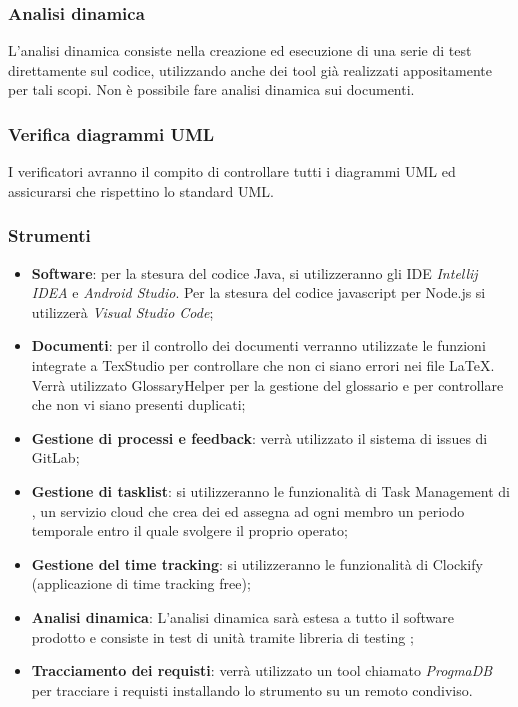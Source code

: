 \subsubsection{Analisi dinamica}
L’analisi dinamica consiste nella creazione ed esecuzione di una serie di test direttamente sul codice, utilizzando anche dei tool già realizzati appositamente per tali scopi. Non è possibile fare analisi dinamica sui documenti.
\subsubsection{Verifica diagrammi UML}
I verificatori avranno il compito di controllare tutti i diagrammi UML ed assicurarsi che rispettino lo standard UML.



\subsubsection{Strumenti}
\begin{itemize}
    \item \textbf{Software}:  per la stesura del codice Java, si utilizzeranno gli IDE \emph{Intellij IDEA} e \emph{Android Studio}. Per la stesura del codice javascript per Node.js si utilizzerà \emph{Visual Studio Code};
    \item \textbf{Documenti}: per il controllo dei documenti verranno utilizzate le funzioni integrate a TexStudio per controllare che non ci siano errori nei file LaTeX. Verrà utilizzato GlossaryHelper per la gestione del glossario e per controllare che non vi siano presenti duplicati;
    \item \textbf{Gestione di processi e feedback}: verrà utilizzato il sistema di issues di GitLab;
    \item \textbf{Gestione di tasklist}: si utilizzeranno le funzionalità di Task Management di , un servizio cloud che crea dei  ed assegna ad ogni membro un periodo temporale entro il quale svolgere il proprio operato;
    \item \textbf{Gestione del time tracking}: si utilizzeranno le funzionalità di Clockify (applicazione di time tracking free);
    \item \textbf{Analisi dinamica}: L'analisi dinamica sarà estesa a tutto il software prodotto e consiste in test di unità tramite libreria di testing ;
    \item \textbf{Tracciamento dei requisti}: verrà utilizzato un tool chiamato \emph{ProgmaDB} per tracciare i requisti installando lo strumento su un  remoto condiviso.
\end{itemize}
